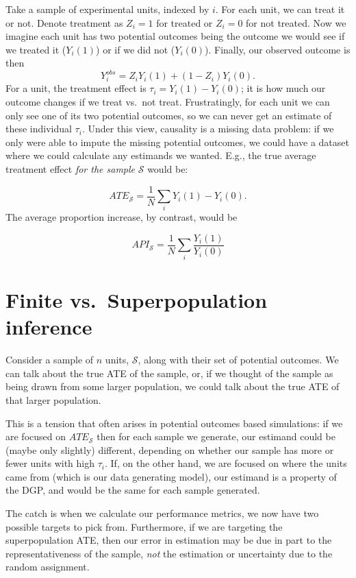 \documentclass[
]{book}
\begin{document}
Take a sample of experimental units, indexed by \(i\).
For each unit, we can treat it or not.
Denote treatment as \(Z_i = 1\) for treated or \(Z_i = 0\) for not treated.
Now we imagine each unit has two potential outcomes being the outcome we would see if we treated it (\(Y_i(1)\)) or if we did not (\(Y_i(0)\)).
Finally, our observed outcome is then
\[ Y_i^{obs} = Z_i Y_i(1) + (1-Z_i)Y_i(0) .\]
For a unit, the treatment effect is \(\tau_i = Y_i(1) - Y_i(0)\); it is how much our outcome changes if we treat vs.~not treat.
Frustratingly, for each unit we can only see one of its two potential outcomes, so we can never get an estimate of these individual \(\tau_i\).
Under this view, causality is a missing data problem: if we only were able to impute the missing potential outcomes, we could have a dataset where we could calculate any estimands we wanted. E.g., the true average treatment effect \emph{for the sample} \(\mathcal{S}\) would be:

\[ ATE_{\mathcal{S}} = \frac{1}{N} \sum_{i} Y_i(1) - Y_i( 0 ) . \]
The average proportion increase, by contrast, would be

\[ API_{\mathcal{S}} = \frac{1}{N} \sum_{i} \frac{Y_i(1)}{Y_i(0)} \]

\section{Finite vs.~Superpopulation inference}\label{finite-vs.-superpopulation-inference}

Consider a sample of \(n\) units, \(\mathcal{S}\), along with their set of potential outcomes.
We can talk about the true ATE of the sample, or, if we thought of the sample as being drawn from some larger population, we could talk about the true ATE of that larger population.

This is a tension that often arises in potential outcomes based simulations: if we are focused on \(ATE_{\mathcal{S}}\) then for each sample we generate, our estimand could be (maybe only slightly) different, depending on whether our sample has more or fewer units with high \(\tau_i\).
If, on the other hand, we are focused on where the units came from (which is our data generating model), our estimand is a property of the DGP, and would be the same for each sample generated.

The catch is when we calculate our performance metrics, we now have two possible targets to pick from.
Furthermore, if we are targeting the superpopulation ATE, then our error in estimation may be due in part to the representativeness of the sample, \emph{not} the estimation or uncertainty due to the random assignment.
\end{document}
